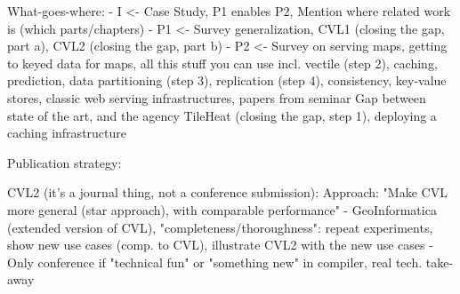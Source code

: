 \documentclass[11pt, oneside]{report}   	%
\begin{document}
What-goes-where:
- I <- Case Study, P1 enables P2, Mention where related work is (which parts/chapters)
- P1 <- 
        Survey generalization, 
        CVL1 (closing the gap, part a), 
        CVL2 (closing the gap, part b)
- P2 <- 
        Survey on serving maps, getting to keyed data for maps, all this stuff you can use 
                incl. vectile (step 2),
                caching,
                prediction,
                data partitioning (step 3), 
                replication (step 4), 
                consistency, 
                key-value stores, 
                classic web serving infrastructures,
                papers from seminar
        Gap between state of the art, and the agency
        TileHeat (closing the gap, step 1), deploying a caching infrastructure
        
Publication strategy:

CVL2 (it's a journal thing, not a conference submission):
Approach: "Make CVL more general (star approach), with comparable performance"
- GeoInformatica (extended version of CVL), "completeness/thoroughness": repeat experiments, show new use cases (comp. to CVL), illustrate CVL2 with the new use cases 
- Only conference if "technical fun" or "something new" in compiler, real tech. take-away
\end{document}
